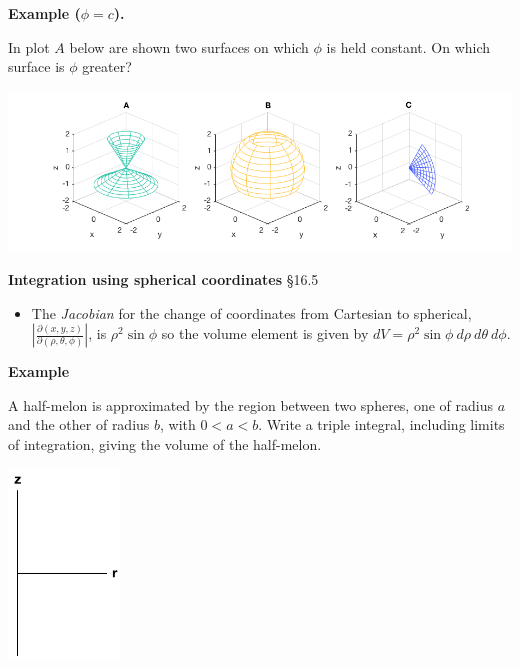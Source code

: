 \documentclass[12pt,letterpaper,noanswers]{exam}
\begin{document}
\noindent\textbf{Example ($\phi = c$).}

In plot $A$ below are shown two surfaces on which $\phi$ is held constant.  On which surface is $\phi$ greater? 

\includegraphics[width=0.8\linewidth]{img/C20p7.png}
    
    
    \eject
    \noindent\textbf{Integration using spherical coordinates} \S 16.5
    \begin{tcolorbox}
    \begin{itemize}
\item The \emph{Jacobian} for the change of coordinates from Cartesian to spherical, $\displaystyle\left\vert\frac{\partial(x,y,z)}{\partial(\rho,\theta,\phi)}\right\vert$, is $\rho^2\sin\phi$ so the volume element is given by $dV = \rho^2\sin\phi\ d\rho\ d\theta\ d\phi$.

\end{itemize} 




\end{tcolorbox}


\noindent\textbf{Example}

A half-melon is approximated by the region between two spheres, one of radius $a$ and the other of radius $b$, with $0<a<b$.  Write a triple integral, including limits of integration, giving the volume of the half-melon.

\includegraphics[height=2in]{img/C13rzaxes.png}
\end{document}

